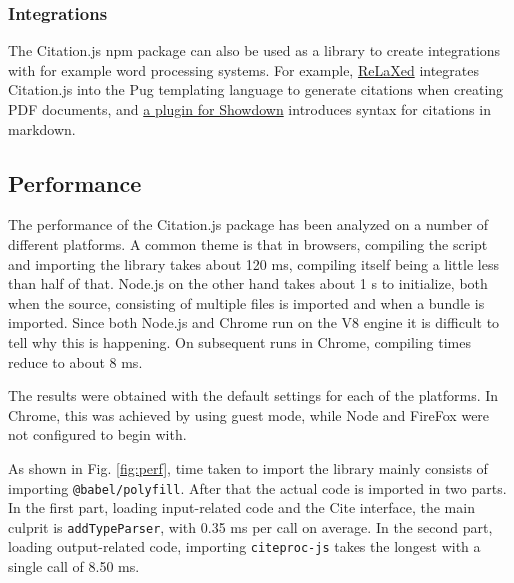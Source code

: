 \documentclass[fleqn,10pt,lineno]{wlpeerj} %
\begin{document}
\subsubsection*{Integrations}

The Citation.js npm package can also be used as a library to create integrations with for example word processing systems. For example, \href{https://github.com/RelaxedJS/ReLaXed}{ReLaXed} integrates Citation.js into the Pug templating language to generate citations when creating PDF documents, and \href{https://github.com/larsgw/citation.js-showdown}{a plugin for Showdown} introduces syntax for citations in markdown.

\subsection*{Performance}

The performance of the Citation.js package has been analyzed on a number of different platforms. A common theme is that in browsers, compiling the script and importing the library takes about 120 ms, compiling itself being a little less than half of that. Node.js on the other hand takes about 1 s to initialize, both when the source, consisting of multiple files is imported and when a bundle is imported. Since both Node.js and Chrome run on the V8 engine it is difficult to tell why this is happening. On subsequent runs in Chrome, compiling times reduce to about 8 ms.

The results were obtained with the default settings for each of the platforms. In Chrome, this was achieved by using guest mode, while Node and FireFox were not configured to begin with.

As shown in Fig. \ref{fig:perf}, time taken to import the library mainly consists of importing \texttt{@babel/polyfill}. After that the actual code is imported in two parts. In the first part, loading input-related code and the Cite interface, the main culprit is \texttt{addTypeParser}, with 0.35 ms per call on average. In the second part, loading output-related code, importing \texttt{citeproc-js} takes the longest with a single call of 8.50 ms.
\end{document}
